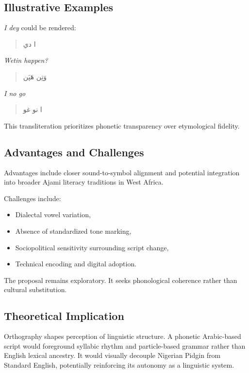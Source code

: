 \documentclass[12pt]{article}
\begin{document}
\subsection{Illustrative Examples}

\textit{I dey} could be rendered:

\begin{quote}
ا دي
\end{quote}

\textit{Wetin happen?}

\begin{quote}
وَتِن هَپَن
\end{quote}

\textit{I no go}

\begin{quote}
ا نو غو
\end{quote}

This transliteration prioritizes phonetic transparency over etymological fidelity.

\subsection{Advantages and Challenges}

Advantages include closer sound-to-symbol alignment and potential integration into broader Ajami literacy traditions in West Africa.

Challenges include:

\begin{itemize}
\item Dialectal vowel variation,
\item Absence of standardized tone marking,
\item Sociopolitical sensitivity surrounding script change,
\item Technical encoding and digital adoption.
\end{itemize}

The proposal remains exploratory. It seeks phonological coherence rather than cultural substitution.

\subsection{Theoretical Implication}

Orthography shapes perception of linguistic structure. A phonetic Arabic-based script would foreground syllabic rhythm and particle-based grammar rather than English lexical ancestry. It would visually decouple Nigerian Pidgin from Standard English, potentially reinforcing its autonomy as a linguistic system.
\end{document}
